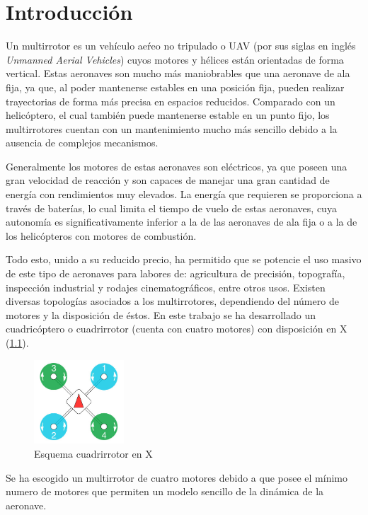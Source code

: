 \chapter{Introducción}

Un multirrotor es un vehículo aeŕeo no tripulado o UAV (por sus siglas en inglés \textit{Unmanned Aerial Vehicles}) cuyos motores y hélices están orientadas de forma vertical. Estas aeronaves son mucho más maniobrables que una aeronave de ala fija, ya que, al poder mantenerse estables en una posición fija, pueden realizar trayectorias de forma más precisa en espacios reducidos. Comparado con un helicóptero, el cual también puede mantenerse estable en un punto fijo, los multirrotores cuentan con un mantenimiento mucho más sencillo debido a la ausencia de complejos mecanismos.

Generalmente los motores de estas aeronaves son eléctricos, ya que poseen una gran velocidad de reacción y son capaces de manejar una gran cantidad de energía con rendimientos muy elevados. La energía que requieren se proporciona a través de baterías, lo cual limita el tiempo de vuelo de estas aeronaves, cuya autonomía es significativamente inferior a la de las aeronaves de ala fija o a la de los helicópteros con motores de combustión.

Todo esto, unido a su reducido precio, ha permitido que se potencie el uso masivo de este tipo de aeronaves para labores de: agricultura de precisión, topografía, inspección industrial y rodajes cinematográficos, entre otros usos. Existen diversas topologías asociados a los multirrotores, dependiendo del número de motores y la disposición de éstos. En este trabajo se ha desarrollado un cuadricóptero o cuadrirrotor (cuenta con cuatro motores) con disposición en X (\cref{Drone_en_X}).

\begin{figure}[htb!]
		\centering
		\includegraphics[width=0.3\textwidth]{introduccion/cuadrirrotorX.jpeg}
		\caption{Esquema cuadrirrotor en X}
		\label{Drone_en_X}
	\end{figure}

Se ha escogido un multirrotor de cuatro motores debido a que posee el mínimo numero de motores que permiten un modelo sencillo de la dinámica de la aeronave.

